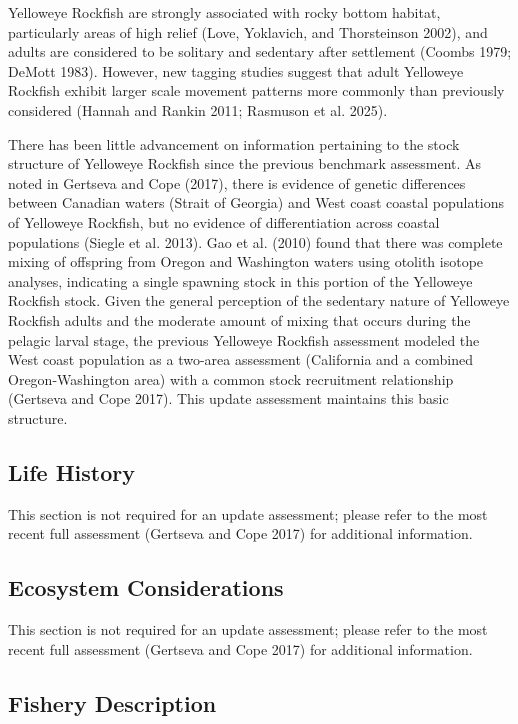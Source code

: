 \documentclass[
  english,
]{article}
\begin{document}
Yelloweye Rockfish are strongly associated with rocky bottom habitat,
particularly areas of high relief (Love, Yoklavich, and Thorsteinson
2002), and adults are considered to be solitary and sedentary after
settlement (Coombs 1979; DeMott 1983). However, new tagging studies
suggest that adult Yelloweye Rockfish exhibit larger scale movement
patterns more commonly than previously considered (Hannah and Rankin
2011; Rasmuson et al. 2025).

There has been little advancement on information pertaining to the stock
structure of Yelloweye Rockfish since the previous benchmark assessment.
As noted in Gertseva and Cope (2017), there is evidence of genetic
differences between Canadian waters (Strait of Georgia) and West coast
coastal populations of Yelloweye Rockfish, but no evidence of
differentiation across coastal populations (Siegle et al. 2013). Gao et
al. (2010) found that there was complete mixing of offspring from Oregon
and Washington waters using otolith isotope analyses, indicating a
single spawning stock in this portion of the Yelloweye Rockfish stock.
Given the general perception of the sedentary nature of Yelloweye
Rockfish adults and the moderate amount of mixing that occurs during the
pelagic larval stage, the previous Yelloweye Rockfish assessment modeled
the West coast population as a two-area assessment (California and a
combined Oregon-Washington area) with a common stock recruitment
relationship (Gertseva and Cope 2017). This update assessment maintains
this basic structure.

\subsection{Life History}\label{life-history}

This section is not required for an update assessment; please refer to
the most recent full assessment (Gertseva and Cope 2017) for additional
information.

\subsection{Ecosystem Considerations}\label{ecosystem-considerations-1}

This section is not required for an update assessment; please refer to
the most recent full assessment (Gertseva and Cope 2017) for additional
information.

\subsection{Fishery Description}\label{fishery-description}
\end{document}
